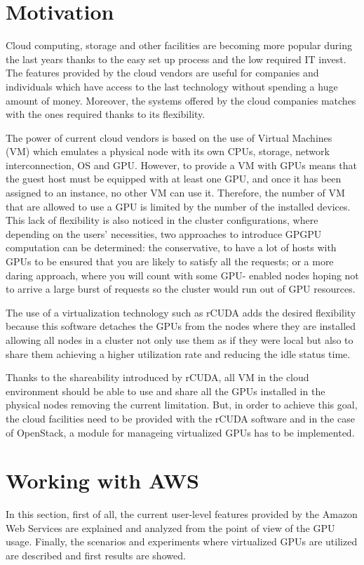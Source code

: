 \documentclass[a4paper,twoside]{article}
\begin{document}
\section{Motivation}
\label{sec:motivation}

Cloud computing, storage and other facilities are becoming 
more popular during the last years thanks to the easy set up 
process and the low required IT invest. The features provided 
by the cloud vendors are useful for companies and individuals 
which have access to the last technology without spending a 
huge amount of money. Moreover, the systems offered by the cloud 
companies matches with the ones required thanks to its flexibility.

The power of current cloud vendors is based on the use 
of Virtual Machines (VM) which  
emulates a physical node with its own 
CPUs, storage, network interconnection, OS and GPU. 
However, to provide a VM with GPUs means
that the guest host must be equipped with at least one GPU, and
once it has been assigned to an instance, no other VM can use
it. Therefore, the number of VM that are allowed to use a GPU is 
limited by the number of the installed devices. This lack of 
flexibility is also noticed in the cluster configurations, where 
depending on the users’ necessities, 
two approaches to introduce GPGPU computation can be determined:
the conservative, to have a lot of hosts with GPUs to be
ensured that you are likely to satisfy all the requests; or a
more daring approach, where you will count with some GPU-
enabled nodes hoping not to arrive a large burst of requests
so the cluster would run out of GPU resources.

The use of a virtualization technology such as {rCUDA} adds 
the desired flexibility because this software detaches the GPUs 
from the nodes where they are installed allowing all nodes in a cluster 
not only use them as if they were local but also to share them 
achieving a higher utilization rate and reducing the idle status time.

Thanks to the shareability introduced by {rCUDA}, all VM in the cloud 
environment should be able to use and share all the GPUs installed in 
the physical nodes removing the current limitation. But, in order to achieve this goal, 
the cloud facilities need to be provided with the {rCUDA} software and 
in the case of OpenStack, a module for manageing virtualized GPUs 
 has to be implemented.  



\section{Working with AWS}
\label{sec:aws}
In this section, first of all, the current user-level features 
provided by the Amazon Web Services are explained and analyzed 
from the point of view of the GPU usage. 
Finally, the scenarios and experiments where virtualized GPUs are utilized are 
described and first results are showed.
\end{document}
